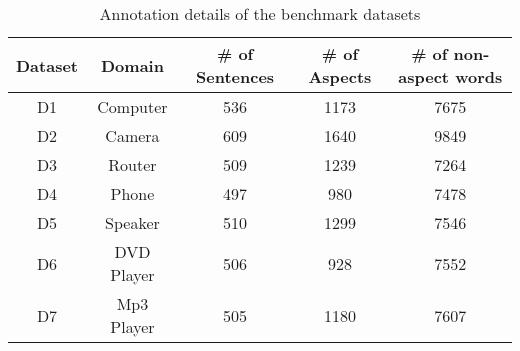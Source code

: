 \documentclass[11pt,a4paper]{article}
\theoremstyle{definition}
\begin{document}
     \begin{table}[t]
         \centering
        \caption{{Annotation details of the datasets}}\label{tab:annotation} 
     \end{table}

\iffalse
     \begin{table}[h]
         \centering
         \begin{adjustbox}{max width=0.5 \textwidth}  

             \begin{tabular}{c|c|c|c|c}
                 \hline
                 {\bf Dataset}& {\bf Domain}&{\bf \# of Sentences}& {\bf \# of Aspects}& {\bf \# of non-aspect words}  \\\hline
                 D1 & Computer     &536    &1173    &7675\\\hline
                 D2 & Camera     &609    &1640    &9849\\\hline
                 D3 & Router     &509    &1239    &7264\\\hline
                 D4 & Phone         &497    &980    &7478\\\hline
                 D5 & Speaker      &510    &1299    &7546\\\hline
                 D6 & DVD Player &506    &928    &7552\\\hline
                 D7 & Mp3 Player &505    &1180     &7607\\\hline
             \end{tabular}
             
        \end{adjustbox}    
         \caption{{Annotation details of the  benchmark datasets}}\label{tab:annotation}
     \end{table}
     
\end{document}
